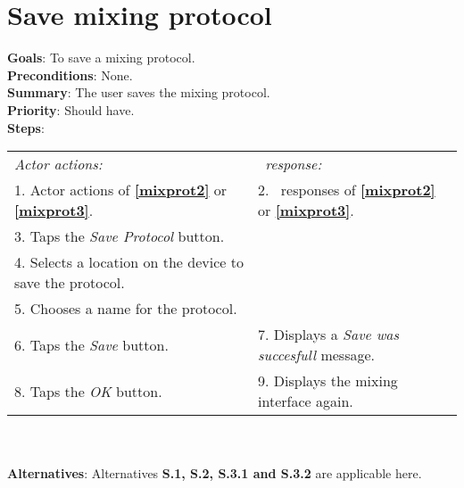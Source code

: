   \section{Save mixing protocol}
  \label{saveprot}
  \textbf{Goals}: To save a mixing protocol.\\
  \textbf{Preconditions}: None. \\ %
  \textbf{Summary}: The user saves the mixing protocol.\\
  \textbf{Priority}: Should have.\\
  \textbf{Steps}: \\
  \begin{tabular}{ p{} p{} }
  	\emph{Actor actions:} & \emph{\projectname\ response:} \\
  	1. Actor actions of \textbf{\ref{mixprot2}} or \textbf{\ref{mixprot3}}. & 2. \projectname\ responses of \textbf{\ref{mixprot2}} or \textbf{\ref{mixprot3}}. \\
    3. Taps the \emph{Save Protocol} button.  & \\
    4. Selects a location on the device to save the protocol. & \\
    5. Chooses a name for the protocol. & \\
    6. Taps the \emph{Save} button. & 7. Displays a \emph{Save was succesfull} message.\\
    8. Taps the \emph{OK} button. & 9. Displays the mixing interface again. \\
      \end{tabular}
    	 \\
    \\\textbf{Alternatives}: Alternatives \textbf{S.1, S.2, S.3.1 and S.3.2} are applicable here.


  
  
